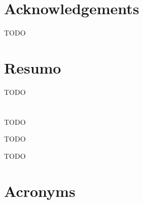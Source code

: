 \cleardoublepage
\chapter*{Acknowledgements}
TODO

\cleardoublepage
\chapter*{Resumo}
TODO

\cleardoublepage
\chapter*{\abstractname}
TODO

\cleardoublepage
{}
\begin{keywords}
 TODO

 TODO
\end{keywords}

\cleardoublepage
{}
\tableofcontents

\cleardoublepage
\listoffigures

\cleardoublepage
\listoftables

\cleardoublepage
\lstlistoflistings

\cleardoublepage
\chapter*{Acronyms}

